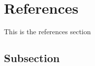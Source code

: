 \section{References}\label{Section label}
This is the references section
\subsection{Subsection}\label{subsection}